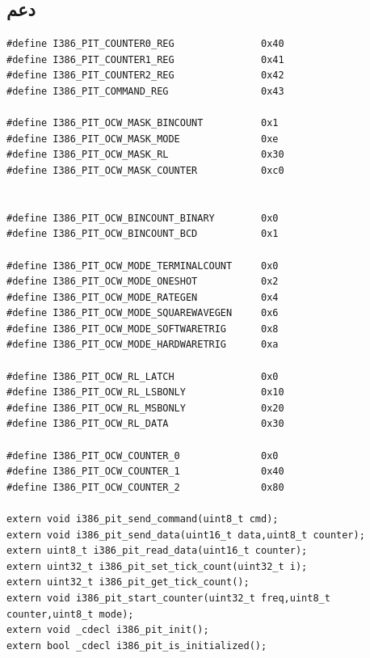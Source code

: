 \documentclass[document.tex]{subfiles}
\begin{document}
\subsection{دعم }

\begin{english}

\lstset{numberstyle=\tiny,numbers=left,stepnumber=1,numbersep=5pt,tabsize=2,extendedchars=true,breaklines=true,frame=b,showspaces=false, showtabs=false,xleftmargin=10pt,framexleftmargin=10pt,framexrightmargin=5pt,framexbottommargin=4pt,showstringspaces=false,language=C++}


\begin{lstlisting}[label=lst:pit_interface,caption=\en{hal/pit.h: PIt Interface}]
#define I386_PIT_COUNTER0_REG				0x40
#define I386_PIT_COUNTER1_REG				0x41
#define I386_PIT_COUNTER2_REG				0x42
#define I386_PIT_COMMAND_REG				0x43

#define I386_PIT_OCW_MASK_BINCOUNT			0x1
#define I386_PIT_OCW_MASK_MODE				0xe
#define I386_PIT_OCW_MASK_RL				0x30
#define I386_PIT_OCW_MASK_COUNTER			0xc0


#define I386_PIT_OCW_BINCOUNT_BINARY		0x0
#define I386_PIT_OCW_BINCOUNT_BCD			0x1

#define I386_PIT_OCW_MODE_TERMINALCOUNT		0x0
#define I386_PIT_OCW_MODE_ONESHOT			0x2
#define I386_PIT_OCW_MODE_RATEGEN			0x4
#define I386_PIT_OCW_MODE_SQUAREWAVEGEN		0x6
#define I386_PIT_OCW_MODE_SOFTWARETRIG		0x8
#define I386_PIT_OCW_MODE_HARDWARETRIG		0xa

#define I386_PIT_OCW_RL_LATCH				0x0
#define I386_PIT_OCW_RL_LSBONLY				0x10
#define I386_PIT_OCW_RL_MSBONLY				0x20
#define I386_PIT_OCW_RL_DATA				0x30

#define I386_PIT_OCW_COUNTER_0				0x0
#define I386_PIT_OCW_COUNTER_1				0x40
#define I386_PIT_OCW_COUNTER_2				0x80

extern void i386_pit_send_command(uint8_t cmd);
extern void i386_pit_send_data(uint16_t data,uint8_t counter);
extern uint8_t i386_pit_read_data(uint16_t counter);
extern uint32_t i386_pit_set_tick_count(uint32_t i);
extern uint32_t i386_pit_get_tick_count();
extern void i386_pit_start_counter(uint32_t freq,uint8_t counter,uint8_t mode);
extern void _cdecl i386_pit_init();
extern bool _cdecl i386_pit_is_initialized();
\end{lstlisting}
\end{english}
\end{document}
